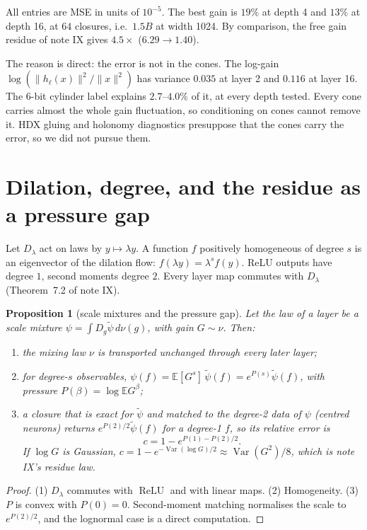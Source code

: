 \documentclass[11pt]{article}
\newtheorem{proposition}[theorem]{Proposition}
\theoremstyle{definition}
\theoremstyle{remark}
\newcommand{\E}{\mathbb E}
\newcommand{\Var}{\operatorname{Var}}
\newcommand{\relu}{\operatorname{ReLU}}
\begin{document}
\noindent All entries are MSE in units of $10^{-5}$. The best gain is $19\%$ at depth 4 and $13\%$ at depth 16, at $64$ closures, i.e.\ $1.5B$ at width 1024. By comparison, the free gain residue of note IX gives $4.5\times$ ($6.29\to1.40$).

The reason is direct: the error is not in the cones. The log-gain $\log(\|h_\ell(x)\|^2/\|x\|^2)$ has variance $0.035$ at layer 2 and $0.116$ at layer 16. The 6-bit cylinder label explains $2.7$--$4.0\%$ of it, at every depth tested. Every cone carries almost the whole gain fluctuation, so conditioning on cones cannot remove it. HDX gluing and holonomy diagnostics presuppose that the cones carry the error, so we did not pursue them.

\section{Dilation, degree, and the residue as a pressure gap}\label{sec:dilation}

Let $D_\lambda$ act on laws by $y\mapsto\lambda y$. A function $f$ positively homogeneous of degree $s$ is an eigenvector of the dilation flow: $f(\lambda y)=\lambda^sf(y)$. ReLU outputs have degree $1$, second moments degree $2$. Every layer map commutes with $D_\lambda$ (Theorem~7.2 of note IX).

\begin{proposition}[scale mixtures and the pressure gap]\label{prop:pressure}
Let the law of a layer be a scale mixture $\psi=\int D_g\tilde\psi\,d\nu(g)$, with gain $G\sim\nu$. Then:
\begin{enumerate}
\item the mixing law $\nu$ is transported unchanged through every later layer;
\item for degree-$s$ observables, $\psi(f)=\E[G^s]\,\tilde\psi(f)=e^{P(s)}\tilde\psi(f)$, with pressure $P(\beta)=\log\E G^\beta$;
\item a closure that is exact for $\tilde\psi$ and matched to the degree-2 data of $\psi$ (centred neurons) returns $e^{P(2)/2}\tilde\psi(f)$ for a degree-1 $f$, so its relative error is
\[
c=1-e^{P(1)-P(2)/2}.
\]
If $\log G$ is Gaussian, $c=1-e^{-\Var(\log G)/2}\approx\Var(G^2)/8$, which is note IX's residue law.
\end{enumerate}
\end{proposition}

\begin{proof}
(1) $D_\lambda$ commutes with $\relu$ and with linear maps. (2) Homogeneity. (3) $P$ is convex with $P(0)=0$. Second-moment matching normalises the scale to $e^{P(2)/2}$, and the lognormal case is a direct computation.
\end{proof}
\end{document}
